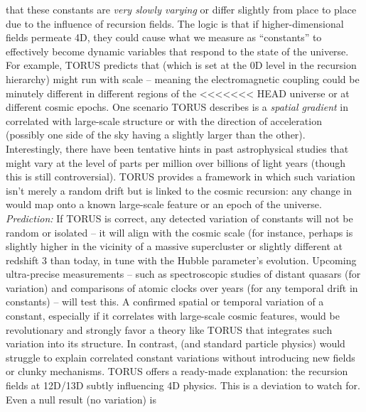 \documentclass[]{article}
\begin{document}
\begin{itemize}
  that these constants are \emph{very slowly varying} or differ slightly
  from place to place due to the influence of recursion fields. The
  logic is that if higher-dimensional fields permeate 4D, they could
  cause what we measure as ``constants'' to effectively become dynamic
  variables that respond to the state of the universe. For example,
  TORUS predicts that \alpha (which is set at the 0D level in the recursion
  hierarchy) might run with scale -- meaning the electromagnetic
  coupling could be minutely different in different regions of the
<<<<<<< HEAD
  universe or at different cosmic epochs\hspace{0pt}. One scenario TORUS
  describes is a \emph{spatial gradient} in \alpha correlated with
  large-scale structure or with the direction of acceleration (possibly
  one side of the sky having a slightly larger \alpha than the
  other)\hspace{0pt}. Interestingly, there have been tentative hints in
  past astrophysical studies that \alpha might vary at the level of parts per
  million over billions of light years (though this is still
  controversial). TORUS provides a framework in which such variation
  isn't merely a random drift but is linked to the cosmic recursion: any
  change in \alpha would map onto a known large-scale feature or an epoch of
  the universe. \emph{Prediction:} If TORUS is correct, any detected
  variation of constants will not be random or isolated -- it will align
  with the cosmic scale (for instance, perhaps \alpha is slightly higher in
  the vicinity of a massive supercluster or slightly different at
  redshift 3 than today, in tune with the Hubble parameter's evolution.
  Upcoming ultra-precise measurements -- such as spectroscopic studies
  of distant quasars (for \alpha variation) and comparisons of atomic clocks
  over years (for any temporal drift in constants) -- will test
  this\hspace{0pt}. A confirmed spatial or temporal variation of a
  constant, especially if it correlates with large-scale cosmic
  features, would be revolutionary and strongly favor a theory like
  TORUS that integrates such variation into its structure. In contrast,
  \LambdaCDM (and standard particle physics) would struggle to explain
  correlated constant variations without introducing new fields or
  clunky mechanisms. TORUS offers a ready-made explanation: the
  recursion fields at 12D/13D subtly influencing 4D physics\hspace{0pt}.
  This is a deviation to watch for. Even a null result (no variation) is

\end{itemize}
\end{document}
